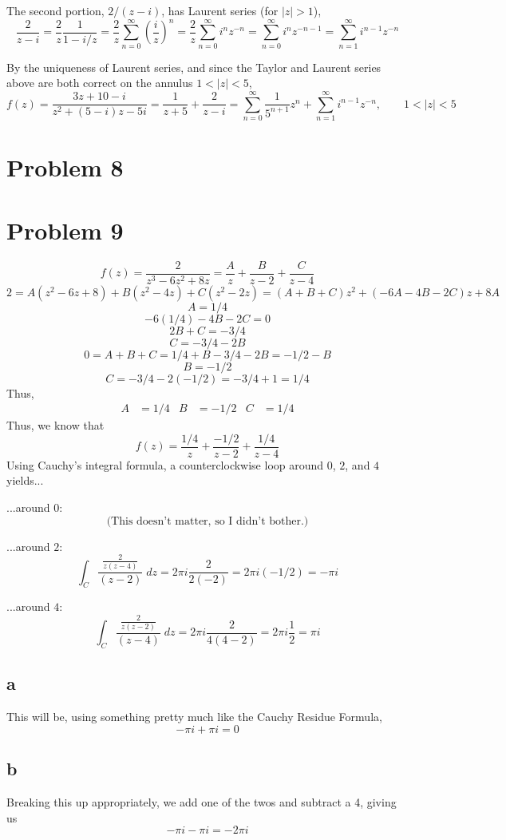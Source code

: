 \documentclass{article}
\theoremstyle{definition}
\newcommand{\p}[1]{\left(#1\right)}
\newcommand{\abs}[1]{\left|#1\right|}
\begin{document}
The second portion, $2/(z-i)$, has Laurent series (for $\abs{z} > 1$),
\[
\frac{2}{z-i} 
= \frac{2}{z} \frac{1}{1-i/z}
= \frac{2}{z} \sum_{n=0}^\infty \p{\frac{i}{z}}^n
= \frac{2}{z} \sum_{n=0}^\infty i^n z^{-n}
= \sum_{n=0}^\infty i^n z^{-n-1}
= \sum_{n=1}^\infty i^{n-1} z^{-n}
\]

By the uniqueness of Laurent series, 
and since the Taylor and Laurent series above are both correct on the annulus
$1 < \abs{z} < 5$, 
\[
f(z) 
= \frac{3z+10-i}{z^2+(5-i)z-5i}
= \frac{1}{z+5} + \frac{2}{z-i}
= \sum_{n=0}^\infty \frac{1}{5^{n+1}} z^n
+ \sum_{n=1}^\infty i^{n-1} z^{-n}, 
\qquad 1 < \abs{z} < 5
\]

\section{Problem 8}
\section{Problem 9}
\[ 
f(z)
= \frac{2}{z^3-6z^2+8z}
= \frac{A}{z} + \frac{B}{z-2} + \frac{C}{z-4}
\]
\[
2 
= A (z^2-6z+8) + B (z^2-4z) + C(z^2-2z)
= (A+B+C)z^2 + (-6A-4B-2C)z + 8A
\]
\[ A = 1/4 \]
\[ -6 (1/4) -4B -2C = 0 \]
\[ 2B+C=-3/4 \]
\[ C=-3/4 - 2B \]
\[ 0 = A+B+C = 1/4 + B -3/4-2B =-1/2-B\]
\[ B=-1/2 \]
\[ C=-3/4 - 2(-1/2) = -3/4 +1 = 1/4 \]
Thus,
\begin{align*}
A &= 1/4 & B &= -1/2 & C &= 1/4
\end{align*}
Thus, we know that
\[ 
f(z) 
= \frac{1/4}{z} + \frac{-1/2}{z-2} + \frac{1/4}{z-4} 
\]
Using Cauchy's integral formula, a counterclockwise loop around $0$, $2$, and $4$
yields...

...around $0$:
\[
\text{(This doesn't matter, so I didn't bother.)}
\]

...around $2$:
\[
\int_C \frac{\frac{2}{z(z-4)}}{(z-2)} \;dz 
= 2 \pi i \frac{2}{2(-2)} 
= 2 \pi i (-1/2)
= - \pi i
\]

...around $4$:
\[
\int_C \frac{\frac{2}{z(z-2)}}{(z-4)} \;dz
= 2 \pi i \frac{2}{4(4-2)} 
= 2 \pi i \frac{1}{2}
= \pi i
\]

\subsection{a}
This will be, using something pretty much like the Cauchy Residue Formula,
\[ -\pi i + \pi i = 0\]

\subsection{b}
Breaking this up appropriately, we add one of the twos and subtract a 4, giving us
\[ -\pi i - \pi i = -2\pi i \]
\end{document}
